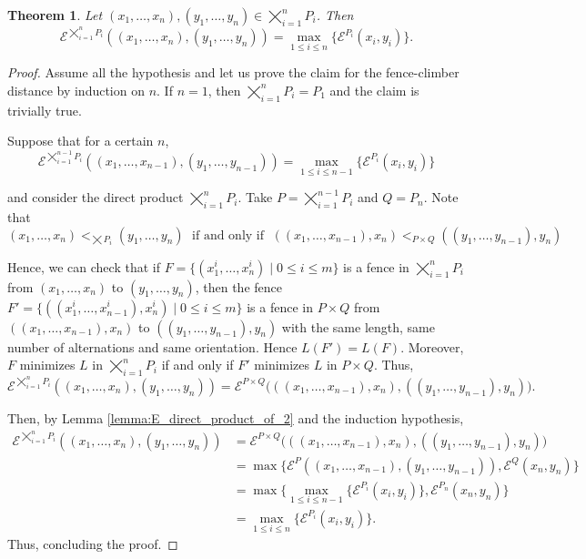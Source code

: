 \documentclass{article}[12pt]
\theoremstyle{exampstyle}
\newtheorem{theorem}{Theorem}[section]
\theoremstyle{remark}
\newcommand{\E}{\mathcal{E}}
\newcommand{\tuple}[3][1]{#2_{#1}, \dots , #2_{#3}}
\begin{document}
\begin{theorem}
    Let $(\tuple{x}{n}),(\tuple{y}{n}) \in \displaystyle \bigtimes_{i=1}^n P_i$. Then 
    \begin{equation*}
        \E^{\bigtimes_{i=1}^n P_i}((\tuple{x}{n}),(\tuple{y}{n})) = \max_{1 \leq i \leq n} \{ \E^{P_i}(x_i,y_i) \}. 
    \end{equation*}
\end{theorem}
\begin{proof}
    Assume all the hypothesis and let us prove the claim for the fence-climber distance by induction on $n$. If $n=1$, then $\bigtimes_{i=1}^n P_i = P_1$ and the claim is trivially true.
    
    Suppose that for a certain $n$, 
    \begin{equation*}
        \E^{\bigtimes_{i=1}^{n-1} P_i}((\tuple{x}{n-1}),(\tuple{y}{n-1})) = \max_{1 \leq i \leq n-1} \{ \E^{P_i}(x_i,y_i) \}
    \end{equation*}

    and consider the direct product $\bigtimes_{i=1}^{n} P_i$. Take $P = \bigtimes_{i=1}^{n-1} P_i$ and $Q = P_n$. Note that 
    \[ (\tuple{x}{n}) <_{\bigtimes P_i} (\tuple{y}{n}) \; \text { if and only if }\; ((\tuple{x}{n-1}) , x_n) <_{P \times Q} ((\tuple{y}{n-1}) , y_n)\]

    Hence, we can check that if $F = \{ (\tuple{x^i}{n}) \mid 0 \leq i \leq m\}$ is a fence in $\bigtimes_{i=1}^{n} P_i$ from $(\tuple{x}{n})$ to $(\tuple{y}{n})$, then the fence $F'  = \{ ((\tuple{x^i}{n-1}), x^i_n) \mid 0 \leq i \leq m\}$ is a fence in $P \times Q$ from $((\tuple{x}{n-1}),x_n)$ to $((\tuple{y}{n-1}),y_n)$ with the same length, same number of alternations and same orientation. Hence $L(F') = L(F)$. Moreover, $F$ minimizes $L$ in $\bigtimes_{i=1}^{n} P_i$ if and only if $F'$ minimizes $L$ in $P \times Q$. Thus, 
    \[
    \E^{\bigtimes_{i=1}^{n} P_i}((\tuple{x}{n}),(\tuple{y}{n})) = \E^{P \times Q} \big( ((\tuple{x}{n-1}),x_n), ((\tuple{y}{n-1}), y_n) \big).
    \]
    
    Then, by Lemma \ref{lemma:E_direct_product_of_2} and the induction hypothesis, 
    \begin{align*}
        \E^{\bigtimes_{i=1}^{n} P_i}((\tuple{x}{n}),(\tuple{y}{n})) &= \E^{P \times Q} \big( ((\tuple{x}{n-1}),x_n), ((\tuple{y}{n-1}), y_n) \big)\\
        &=\max \{ \E^P((\tuple{x}{n-1}),(\tuple{y}{n-1})) , \E^Q(x_n,y_n)\} \\
        &= \max \{ \max_{1 \leq i \leq n-1} \{ \E^{P_i}(x_i,y_i) \} , \E^{P_n}(x_n,y_n)\} \\
        &= \max_{1 \leq i \leq n} \{ \E^{P_i}(x_i,y_i) \}.
    \end{align*}
    Thus, concluding the proof. 
\end{proof}
\end{document}
